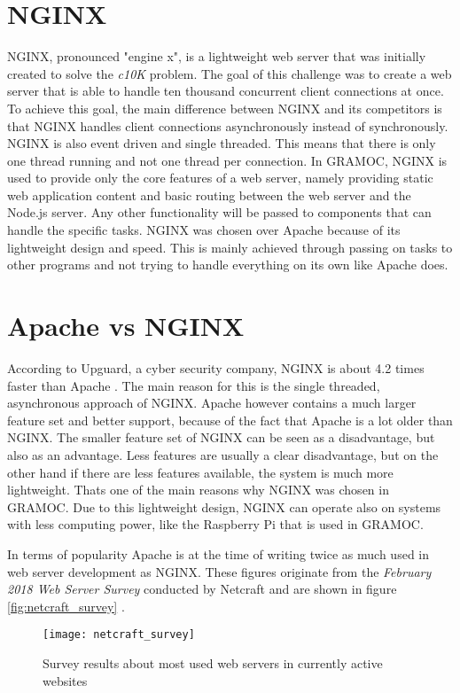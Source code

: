 \section{NGINX}
NGINX, pronounced "engine x", is a lightweight web server that was initially created to solve the \textit{c10K} problem. The goal of this challenge was to create a web server that is able to handle ten thousand concurrent client connections at once. To achieve this goal, the main difference between NGINX and its competitors is that NGINX handles client connections asynchronously instead of synchronously. NGINX is also event driven and single threaded. This means that there is only one thread running and not one thread per connection. In GRAMOC, NGINX is used to provide only the core features of a web server, namely providing static web application content and basic routing between the web server and the Node.js server. Any other functionality will be passed to components that can handle the specific tasks. NGINX was chosen over Apache because of its lightweight design and speed. This is mainly achieved through passing on tasks to other programs and not trying to handle everything on its own like Apache does.

\section{Apache vs NGINX}
According to Upguard, a cyber security company, NGINX is about 4.2 times faster than Apache \autocite{UpguardAvN}. The main reason for this is the single threaded, asynchronous approach of NGINX.
Apache however contains a much larger feature set and better support, because of the fact that Apache is a lot older than NGINX. The smaller feature set of NGINX can be seen as a disadvantage, but also as an advantage. Less features are usually a clear disadvantage, but on the other hand if there are less features available, the system is much more lightweight. Thats one of the main reasons why NGINX was chosen in GRAMOC. Due to this lightweight design, NGINX can operate also on systems with less computing power, like the Raspberry Pi that is used in GRAMOC.

In terms of popularity Apache is at the time of writing twice as much used in web server development as NGINX. These figures originate from the \textit{February 2018 Web Server Survey} conducted by Netcraft and are shown in figure \vref{fig:netcraft_survey} \autocite{netcraft_survey}.

\begin{figure}[h]
    \centering
    \texttt{[image: netcraft\_survey]}
    \caption{Survey results about most used web servers in currently active websites}
    \label{fig:netcraft_survey}
\end{figure}

